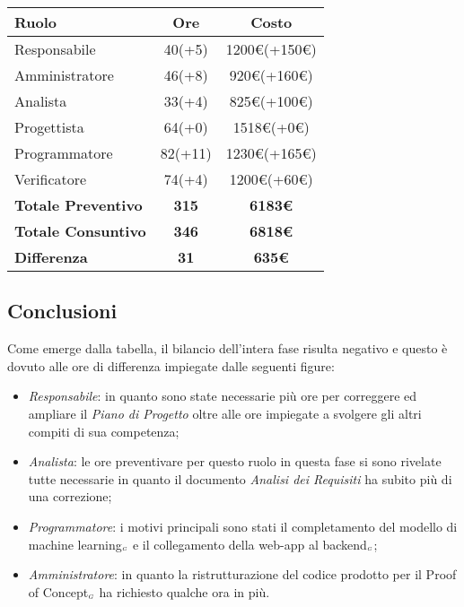 {{{{{{{{{{{			\quad
			\def\tabularxcolumn#1{m{#1}}
			{
				\begin{center}
					\renewcommand{\arraystretch}{1.4}
					\begin{tabularx}{10cm}{|X|c|c|}
						\hline
						\rowcolor{airforceblue}
						\textbf{Ruolo} & \textbf{Ore} & \textbf{Costo}\\
						\hline
						Responsabile & 40(+5) & 1200\euro(+150\euro)\\
						\hline
						Amministratore & 46(+8) & 920\euro(+160\euro)\\
						\hline
						Analista & 33(+4) & 825\euro(+100\euro)\\
						\hline
						Progettista & 64(+0) & 1518\euro(+0\euro)\\
						\hline
						Programmatore & 82(+11) & 1230\euro(+165\euro)\\
						\hline
						Verificatore & 74(+4) & 1200\euro(+60\euro)\\
						\hline
						\textbf{Totale Preventivo} & \textbf{315} & \textbf{6183\euro}\\
						\hline
						\textbf{Totale Consuntivo} & \textbf{346} & \textbf{6818\euro}\\
						\hline
						\textbf{Differenza} & \textbf{31} & \textbf{635\euro}
					\end{tabularx}
				\end{center}
				
\subsection{Conclusioni}\label{ConsuntivoPeriodoDiProgettazioneDettaglioCodificaConclusioni}
Come emerge dalla tabella, il bilancio dell'intera fase risulta negativo e questo è dovuto alle ore di differenza impiegate dalle seguenti figure: 
\begin{itemize}
	\item \textit{Responsabile}: in quanto sono state necessarie più ore per correggere ed ampliare il \textit{Piano di Progetto} oltre alle ore impiegate a svolgere gli altri compiti di sua competenza;
	\item \textit{Analista}: le ore preventivare per questo ruolo in questa fase si sono rivelate tutte necessarie in quanto il documento \textit{Analisi dei Requisiti} ha subito più di una correzione;
	\item \textit{Programmatore}: i motivi principali sono stati il completamento del modello di machine learning$_{\scaleto{G}{3pt}}$ e il collegamento della web-app al backend$_{\scaleto{G}{3pt}}$;
	\item \textit{Amministratore}: in quanto la ristrutturazione del codice prodotto per il Proof of Concept$_{\scaleto{G}{3pt}}$ ha richiesto qualche ora in più.
\end{itemize}
				
}}}}}}}}}}}}
